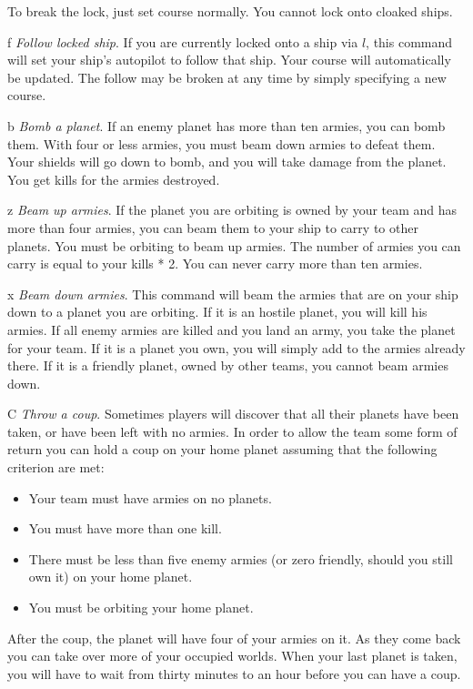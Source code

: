 \begin{list}{}{
	\renewcommand{\makelabel}[1]{{\tt #1 \hfill}}
         \setlength{\leftmargin}{.5in}
         \setlength{\labelwidth}{\leftmargin}
         \setlength{\labelsep}{0in}
}
To break the lock, just set course normally.  You cannot lock
onto cloaked ships.

\item[f]{\em Follow locked ship}.
If you are currently locked onto a ship via $l$, this command will set your
ship's autopilot to follow that ship. Your course will automatically be updated.
The follow may be broken at any time by simply specifying a new course.

\item[b]{\em Bomb a planet}.
If an enemy planet has more than ten armies, you can bomb them.  With
four or less armies, you must beam down armies to defeat them.  Your
shields will go down to bomb, and you will take damage from the
planet.  You get kills for the armies destroyed.

\item[z]{\em Beam up armies}.
If the planet you are orbiting is owned by your team and has more than
four armies, you can beam them to your ship to carry to other planets.
You must be orbiting to beam up armies.  The number of armies you can
carry is equal to your kills * 2.  You can never carry more than ten
armies.

\item[x]{\em Beam down armies}.
This command will beam the armies that are on your ship down to a
planet you are orbiting.  If it is an hostile planet, you will kill his
armies.  If all enemy armies are killed and you land an army, you take
the planet for your team.  If it is a planet you own, you will simply
add to the armies already there.  If it is a friendly planet, owned by
other teams, you cannot beam armies down.

\item[C]{\em Throw a coup}.
Sometimes players will discover that all their planets have been
taken, or have been left with no armies.
In order to allow the team some form of return you can hold a coup
on your home planet assuming that the following criterion are met:
\begin{itemize}
\item Your team must have armies on no planets.
\item You must have more than one kill.
\item There must be less than five enemy armies (or zero friendly, should
you still own it) on your home planet.
\item You must be orbiting your home planet.
\end{itemize}
After the coup, the planet will have four of your armies on it.
As they come back you can take over more of your occupied worlds.
When your last planet is taken, you will have to wait from thirty
minutes to an hour before you can have a coup.


\end{list}
